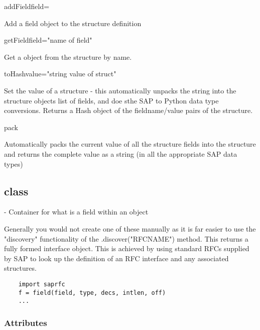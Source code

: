 \documentclass{howto}
\begin{document}
\begin{methoddesc}[struct]{addField}{field=}

Add a field object to the structure definition

\end{methoddesc}


\begin{methoddesc}[struct]{getField}{field="name of field"}

Get a  object from the structure by name.

\end{methoddesc}


\begin{methoddesc}[struct]{toHash}{value="string value of struct"}

Set the value of a structure - this automatically unpacks the string into the structure
objects list of fields, and doe sthe SAP to Python data type conversions. Returns a Hash
object of the fieldname/value pairs of the structure.

\end{methoddesc}


\begin{methoddesc}[struct]{pack}{}

Automatically packs the current value of all the structure fields into the structure
and returns the complete value as a string (in all the appropriate SAP data types)

\end{methoddesc}


\subsection{class  \label{classfield}}

 - Container for what is a field within an  object

Generally you would not create one of these manually as it is far easier to use the "discovery" functionality of the .discover("RFCNAME") method.  This returns a fully formed interface object.  This is achieved by using standard RFCs supplied by SAP to look up the definition of an RFC interface and any associated structures.


\begin{verbatim}
	import saprfc
	f = field(field, type, decs, intlen, off)
	...
\end{verbatim}


\subsubsection{Attributes \label{fieldattrs}}
\end{document}
